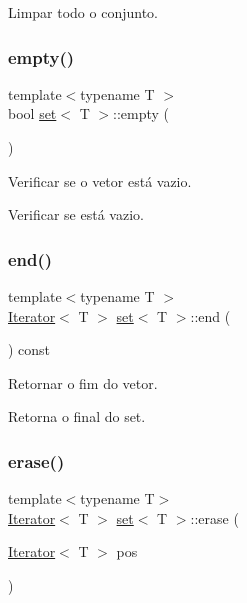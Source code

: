 Limpar todo o conjunto. 

\mbox{\label{classset_ac86aef3344daceab852a6740656a41aa}} 
\subsubsection{\texorpdfstring{empty()}{empty()}}
{\footnotesize\ttfamily template$<$typename T $>$ \\
bool \hyperlink{classset}{set}$<$ T $>$\+::empty (\begin{DoxyParamCaption}{ }\end{DoxyParamCaption})}



Verificar se o vetor está vazio. 

Verificar se está vazio. \mbox{\label{classset_a9925f338794495438768190b906e4022}} 
\subsubsection{\texorpdfstring{end()}{end()}}
{\footnotesize\ttfamily template$<$typename T $>$ \\
\hyperlink{classIterator}{Iterator}$<$ T $>$ \hyperlink{classset}{set}$<$ T $>$\+::end (\begin{DoxyParamCaption}{ }\end{DoxyParamCaption}) const}



Retornar o fim do vetor. 

Retorna o final do set. \mbox{\label{classset_ad7fd389661e732276df21ecec7300c60}} 
\subsubsection{\texorpdfstring{erase()}{erase()}}
{\footnotesize\ttfamily template$<$typename T$>$ \\
\hyperlink{classIterator}{Iterator}$<$ T $>$ \hyperlink{classset}{set}$<$ T $>$\+::erase (\begin{DoxyParamCaption}\item[{\hyperlink{classIterator}{Iterator}$<$ T $>$}]{pos }\end{DoxyParamCaption})}



